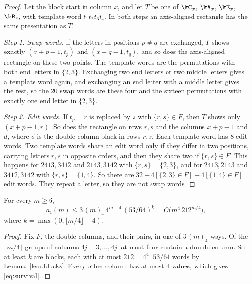 \begin{proof}
Let the block start in column $x$, and let $T$ be one of $\kC_x$, $\kA_x$, $\kE_x$, $\kB_x$, with template word $t_1t_2t_3t_4$. In both steps an axis-aligned rectangle has the same presentation as $T$.

\emph{Step 1. Swap words.} If the letters in positions $p\ne q$ are exchanged, $T$ shows exactly $(x+p-1,t_p)$ and $(x+q-1,t_q)$, and so does the axis-aligned rectangle on these two points. The template words are the permutations with both end letters in $\{2,3\}$. Exchanging two end letters or two middle letters gives a template word again, and exchanging an end letter with a middle letter gives the rest, so the $20$ swap words are these four and the sixteen permutations with exactly one end letter in $\{2,3\}$.

\emph{Step 2. Edit words.} If $t_p=r$ is replaced by $s$ with $\{r,s\}\in F$, then $T$ shows only $(x+p-1,r)$. So does the rectangle on rows $r,s$ and the columns $x+p-1$ and $d$, where $d$ is the double column black in rows $r,s$. Each template word has $8$ edit words. Two template words share an edit word only if they differ in two positions, carrying letters $r,s$ in opposite orders, and then they share two if $\{r,s\}\in F$. This happens for $2413,3412$ and $2143,3142$ with $\{r,s\}=\{2,3\}$, and for $2413,2143$ and $3412,3142$ with $\{r,s\}=\{1,4\}$. So there are $32-4[\{2,3\}\in F]-4[\{1,4\}\in F]$ edit words. They repeat a letter, so they are not swap words.
\end{proof}

\begin{theorem}\label{thm:foursurvival}
For every $m\ge6$,
\begin{equation}\label{eq:survival}
a_4(m)\le3\,(m)_4\,4^{m-4}\,(53/64)^k=O\bigl(m^4\,212^{m/4}\bigr),
\end{equation}
where $k=\max(0,\lfloor m/4\rfloor-4)$.
\end{theorem}

\begin{proof}
Fix $F$, the double columns, and their pairs, in one of $3\,(m)_4$ ways. Of the $\lfloor m/4\rfloor$ groups of columns $4j-3,\ldots,4j$, at most four contain a double column. So at least $k$ are blocks, each with at most $212=4^4\cdot53/64$ words by Lemma~\ref{lem:blocks}. Every other column has at most $4$ values, which gives \eqref{eq:survival}.
\end{proof}

